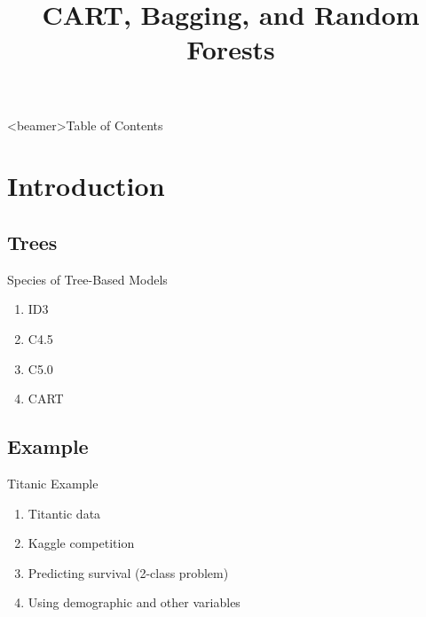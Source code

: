 \documentclass[pdf]{beamer}
\title[Random Forests]{CART, Bagging, and Random Forests}
\author{}
\date{}
\begin{document}
\begin{frame}
\titlepage
\end{frame}



\begin{frame}<beamer>{Table of Contents}
	\tableofcontents[currentsection, 
				 currentsubsection, 
				 sectionstyle=show, 
				 subsectionstyle=show]
\end{frame}


\section{Introduction}
	\subsection{Trees}
		\begin{frame}{Species of Tree-Based Models}
			\begin{enumerate}
				\item{ID3}
				\item{C4.5}
				\item{C5.0}
				\item{CART}
			\end{enumerate}
		\end{frame}
			
	
	\subsection{Example}	
		
		\begin{frame}{Titanic Example}
			\begin{enumerate}
				\item{Titantic data}
				\item{Kaggle competition}
				\item{Predicting survival (2-class problem)}
				\item{Using demographic and other variables}
			\end{enumerate}
		\end{frame}
		
		
		
\end{document}
